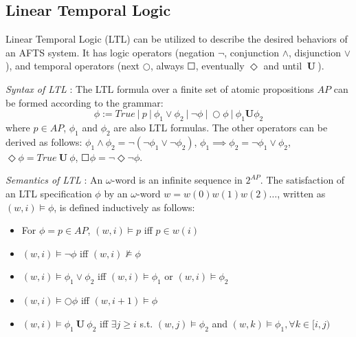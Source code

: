 \subsection{Linear Temporal Logic}

Linear Temporal Logic (LTL) can be utilized to describe the desired behaviors of an AFTS system. It has logic operators (negation $ \neg $, conjunction $ \wedge $, disjunction $ \vee $), and temporal operators (next $ \bigcirc $, always $ \Square $, eventually $ \Diamond $ and until $ \mathbf{\ U\ }$).


{\color{teal}\emph{ Syntax of LTL} \cite{baier2008principles}: The LTL formula over a finite set of atomic propositions $ AP $ can be formed according to the grammar:}
\begin{displaymath}
	\phi := True\ \vert\ p\ \vert\ \phi_1 \vee \phi_2\ \vert\ \neg \phi\ \vert\ \bigcirc \phi\ \vert\ \phi_1 \mathbf{U}\phi_2
\end{displaymath}
where $ p\in AP $, $ \phi_1 $ and $ \phi_2 $ are also LTL formulas. The other operators can be derived as follows: $ \phi_1 \wedge \phi_2 = \neg (\neg \phi_1 \vee \neg \phi_2) $, $ \phi_1 \implies \phi_2 = \neg \phi_1 \vee \phi_2 $, $ \Diamond \phi = True \mathbf{\ U\ } \phi $, $ \Square \phi = \neg \Diamond \neg \phi $.

{\color{teal}\emph{Semantics of LTL} \cite{Nilsson2017}:} An $\omega$-word is an infinite sequence in $ 2^{AP}$.  The satisfaction of an LTL specification $ \phi $ by an $\omega$-word $ w = w(0)w(1)w(2)\dots $, written as $ (w,i) \models \phi $, is defined inductively as follows:
\begin{itemize}
	\item For $ \phi = p \in AP $, $ (w,i)\models p $ iff $ p\in w(i) $ 
	\item $ (w,i)\models \neg \phi $ iff $ (w,i)\not\models \phi $
	\item $ (w,i)\models  \phi_1 \vee \phi_2 $ iff $ (w,i)\models \phi_1 $ or $ (w,i)\models \phi_2 $
	\item $ (w,i) \models \bigcirc \phi $ iff $ (w,i+1) \models \phi $
	\item $ (w,i)\models \phi_1 \mathbf{\ U\ } \phi_2 $ iff $\exists j\geq i  $ s.t. $ (w,j)\models \phi_2 $ and $ (w,k)\models \phi_1, \forall k\in [i,j) $
\end{itemize} 

